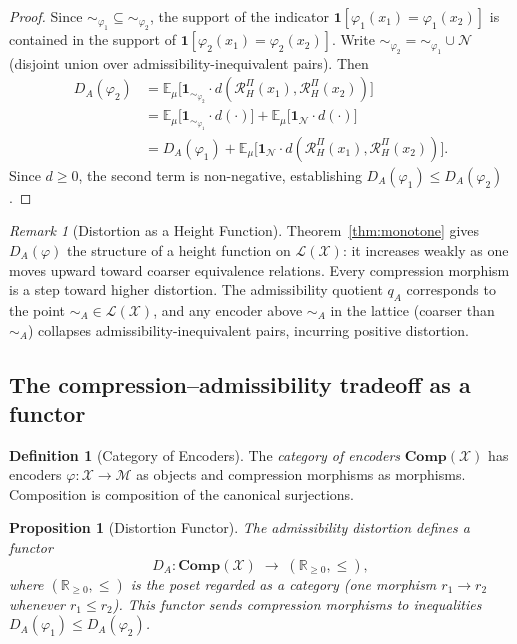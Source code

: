 \documentclass[11pt, a4paper]{article}
\theoremstyle{plain}
\newtheorem{proposition}[theorem]{Proposition}
\theoremstyle{definition}
\newtheorem{definition}[theorem]{Definition}
\theoremstyle{remark}
\newtheorem{remark}[theorem]{Remark}
\newcommand{\E}{\mathbb{E}}
\newcommand{\R}{\mathbb{R}}
\newcommand{\calX}{\mathcal{X}}
\newcommand{\calM}{\mathcal{M}}
\newcommand{\calL}{\mathcal{L}}
\newcommand{\simA}{\sim_{\!A}}
\newcommand{\RHP}{\mathcal{R}_{H}^{\Pi}}
\newcommand{\DA}{D_{A}(\varphi)}
\newcommand{\Comp}{\mathbf{Comp}}
\begin{document}
\begin{proof}
Since ${\sim_{\varphi_1}} \subseteq {\sim_{\varphi_2}}$, the support of the
indicator $\mathbf{1}[\varphi_1(x_1) = \varphi_1(x_2)]$ is contained in the
support of $\mathbf{1}[\varphi_2(x_1) = \varphi_2(x_2)]$. Write
${\sim_{\varphi_2}} = {\sim_{\varphi_1}} \cup \mathcal{N}$ (disjoint union
over admissibility-inequivalent pairs). Then
\begin{align*}
  D_A(\varphi_2)
  &= \E_\mu\!\bigl[\mathbf{1}_{{\sim_{\varphi_2}}}
      \cdot d(\RHP(x_1), \RHP(x_2))\bigr] \\
  &= \E_\mu\!\bigl[\mathbf{1}_{{\sim_{\varphi_1}}}
      \cdot d(\cdot)\bigr]
    + \E_\mu\!\bigl[\mathbf{1}_\mathcal{N}
      \cdot d(\cdot)\bigr] \\
  &= D_A(\varphi_1) + \E_\mu\!\bigl[\mathbf{1}_\mathcal{N}
      \cdot d(\RHP(x_1), \RHP(x_2))\bigr].
\end{align*}
Since $d \geq 0$, the second term is non-negative, establishing $D_A(\varphi_1)
\leq D_A(\varphi_2)$.
\end{proof}

\begin{remark}[Distortion as a Height Function]
Theorem~\ref{thm:monotone} gives $\DA$ the structure of a height function on
$\calL(\calX)$: it increases weakly as one moves upward toward coarser
equivalence relations. Every compression morphism is a step toward higher
distortion. The admissibility quotient $q_A$ corresponds to the point
$\simA \in \calL(\calX)$, and any encoder above $\simA$ in the lattice
(coarser than $\simA$) collapses admissibility-inequivalent pairs, incurring
positive distortion.
\end{remark}

\subsection{The compression--admissibility tradeoff as a functor}

\begin{definition}[Category of Encoders]
\label{def:comp_cat}
The \emph{category of encoders} $\Comp(\calX)$ has encoders
$\varphi\colon \calX \to \calM$ as objects and compression morphisms as
morphisms. Composition is composition of the canonical surjections.
\end{definition}

\begin{proposition}[Distortion Functor]
\label{prop:distortion_functor}
The admissibility distortion defines a functor
\[
  D_A\colon \Comp(\calX) \;\longrightarrow\; (\R_{\geq 0}, \leq),
\]
where $(\R_{\geq 0}, \leq)$ is the poset regarded as a category (one morphism
$r_1 \to r_2$ whenever $r_1 \leq r_2$). This functor sends compression
morphisms to inequalities $D_A(\varphi_1) \leq D_A(\varphi_2)$.
\end{proposition}
\end{document}
